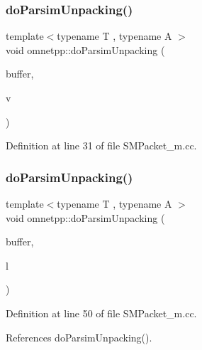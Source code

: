 \mbox{\label{namespaceomnetpp_a5d85de2bce765edaa5f7b1651f94f37c}} 
\subsubsection{\texorpdfstring{do\+Parsim\+Unpacking()}{doParsimUnpacking()}\hspace{0.1cm}{\footnotesize\ttfamily [1/5]}}
{\footnotesize\ttfamily template$<$typename T , typename A $>$ \\
void omnetpp\+::do\+Parsim\+Unpacking (\begin{DoxyParamCaption}\item[{omnetpp\+::c\+Comm\+Buffer $\ast$}]{buffer,  }\item[{std\+::vector$<$ T, A $>$ \&}]{v }\end{DoxyParamCaption})}



Definition at line 31 of file S\+M\+Packet\+\_\+m.\+cc.

\mbox{\label{namespaceomnetpp_a28632f95fc2029c95828ed30e379f9ee}} 
\subsubsection{\texorpdfstring{do\+Parsim\+Unpacking()}{doParsimUnpacking()}\hspace{0.1cm}{\footnotesize\ttfamily [2/5]}}
{\footnotesize\ttfamily template$<$typename T , typename A $>$ \\
void omnetpp\+::do\+Parsim\+Unpacking (\begin{DoxyParamCaption}\item[{omnetpp\+::c\+Comm\+Buffer $\ast$}]{buffer,  }\item[{std\+::list$<$ T, A $>$ \&}]{l }\end{DoxyParamCaption})}



Definition at line 50 of file S\+M\+Packet\+\_\+m.\+cc.



References do\+Parsim\+Unpacking().

\mbox{\label{namespaceomnetpp_a8ae2ca4f89c4d2f8a95512b5b2936c79}} 
